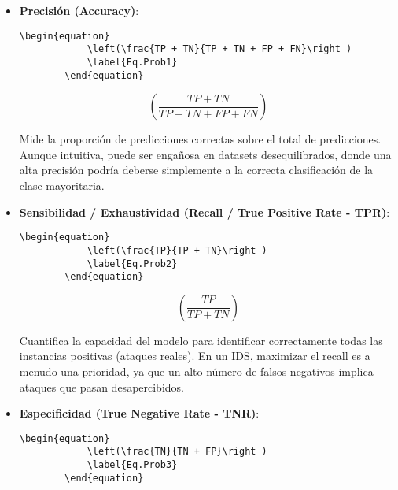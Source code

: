 \begin{itemize}

    \item\textbf{Precisión (Accuracy)}: 
        \begin{lstlisting}[language={[LaTeX]TeX},caption={Definición de una ecuación para la Precisión},label=List.Ecuacion]
        \begin{equation}
            \left(\frac{TP + TN}{TP + TN + FP + FN}\right )
            \label{Eq.Prob1}
        \end{equation}
        \end{lstlisting}

        \begin{equation}
            \left(\frac{TP + TN}{TP + TN + FP + FN}\right )
            \label{Eq.Prob2}
        \end{equation}
    
     Mide la proporción de predicciones correctas sobre el total de predicciones. Aunque intuitiva, puede ser engañosa en datasets desequilibrados, donde una alta precisión podría deberse simplemente a la correcta clasificación de la clase mayoritaria.
    
    \item\textbf{Sensibilidad / Exhaustividad (Recall / True Positive Rate - TPR)}: 
        \begin{lstlisting}[language={[LaTeX]TeX},caption={Definición de una ecuación para la Sensibilidad},label=List.Ecuacion]
        \begin{equation}
            \left(\frac{TP}{TP + TN}\right )
            \label{Eq.Prob2}
        \end{equation}
        \end{lstlisting}

        \begin{equation}
            \left(\frac{TP}{TP + TN}\right )
            \label{Eq.Prob1}
        \end{equation}

     Cuantifica la capacidad del modelo para identificar correctamente todas las instancias positivas (ataques reales). En un IDS, maximizar el recall es a menudo una prioridad, ya que un alto número de falsos negativos implica ataques que pasan desapercibidos.
    
    \item\textbf{Especificidad (True Negative Rate - TNR)}:
        \begin{lstlisting}[language={[LaTeX]TeX},caption={Definición de una ecuación para la Especificidad},label=List.Ecuacion]
        \begin{equation}
            \left(\frac{TN}{TN + FP}\right )
            \label{Eq.Prob3}
        \end{equation}
        \end{lstlisting}


\end{itemize}
